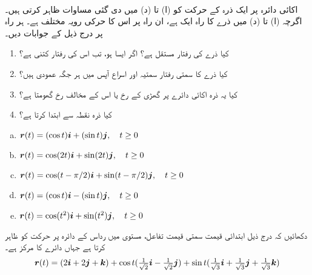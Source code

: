 \\
اکائی دائرہ  پر ایک ذرہ کے  حرکت کو  (ا) تا (د) میں دی گئی  مساوات ظاہر کرتی ہیں۔اگرچہ (ا) تا (د) میں ذرے کا  راہ ایک ہے، ان راہ پر  اس کا حرکی رویہ مختلف ہے۔ ہر راہ پر درج ذیل کے جوابات دیں۔
\begin{enumerate}[1.]
\item
کیا ذرے کی رفتار مستقل ہے؟ اگر ایسا ہو، تب اس کی رفتار کتنی ہے؟
\item
کیا ذرے کا سمتی رفتار سمتیہ اور اسراع آپس میں ہر جگہ  عمودی ہیں؟
\item
کیا یہ ذرہ اکائی دائرے پر گھڑی کے رخ   یا اس کے مخالف رخ گھومتا ہے؟ 
\item
کیا ذرہ نقطہ  سے ابتدا کرتا ہے؟
\end{enumerate}  
\begin{enumerate}[a.]
\item
${{\boldsymbol{r}}}(t)=(\cos t){\boldsymbol{i}}+(\sin t){\boldsymbol{j}},\quad t\ge 0$
\item
${{\boldsymbol{r}}}(t)=\cos (2t){\boldsymbol{i}}+\sin(2t){\boldsymbol{j}},\quad t\ge 0$
\item
${{\boldsymbol{r}}}(t)=\cos(t-\pi/2){\boldsymbol{i}}+\sin (t-\pi/2){\boldsymbol{j}},\quad t\ge 0$
\item
${{\boldsymbol{r}}}(t)=(\cos t){\boldsymbol{i}}-(\sin t){\boldsymbol{j}},\quad t\ge 0$
\item
${{\boldsymbol{r}}}(t)=\cos(t^2){\boldsymbol{i}}+\sin(t^2){\boldsymbol{j}},\quad t\ge 0$
\end{enumerate}
دکھائیں کہ درج ذیل ابتدائی قیمت سمتی قیمت تفاعل، مستوی   میں  رداس  کے دائرہ پر حرکت کو ظاہر کرتا ہے جہاں دائرے کا مرکز  ہے۔
\begin{align*}
{\ensuremath{{\boldsymbol{r}}}}(t)=(2{\boldsymbol{i}}+2{\boldsymbol{j}}+{\boldsymbol{k}})+\cos t(\tfrac{1}{\sqrt{2}}{\boldsymbol{i}}-\tfrac{1}{\sqrt{2}}{\boldsymbol{j}})+\sin t(\tfrac{1}{\sqrt{3}}{\boldsymbol{i}}+\tfrac{1}{\sqrt{3}}{\boldsymbol{j}}+\tfrac{1}{\sqrt{3}}{\boldsymbol{k}})
\end{align*} 

